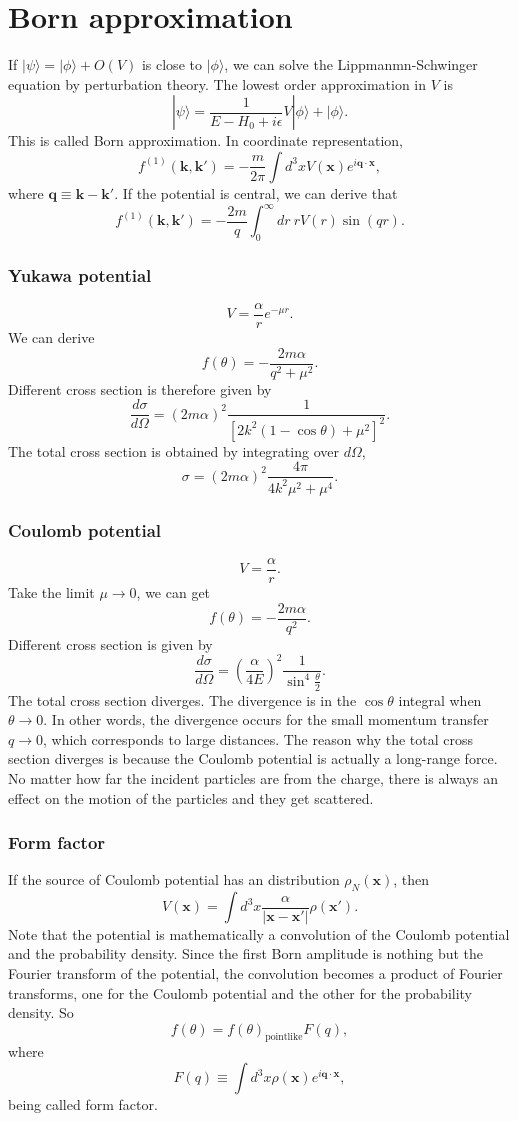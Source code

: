 \section{Born approximation}
If $|\psi\rangle = |\phi\rangle + O(V)$ is close to $|\phi\rangle$, we can solve the Lippmanmn-Schwinger equation by perturbation theory. The lowest order approximation in $V$ is
\[|\psi\rangle = \frac{1}{E-H_0 + i\epsilon} V|\phi\rangle + |\phi\rangle.\]
This is called Born approximation. In coordinate representation,
\[f^{(1)}(\bm{k},\bm{k}') = - \frac{m}{2\pi} \int d^3x V(\bm{x}) e^{i\bm{q}\cdot\bm{x}},\]
where $\bm{q} \equiv \bm{k} - \bm{k}'$. If the potential is central, we can derive that
\[f^{(1)}(\bm{k},\bm{k}') = - \frac{2m}{q} \int_0^{\infty} dr \: r V(r) \sin(qr).\]

\subsubsection{Yukawa potential}
\[V = \frac{\alpha}{r}  e^{-\mu r}.\]
We can derive
\[f(\theta) = - \frac{2m\alpha}{q^2 + \mu^2}.\]
Different cross section is therefore given by
\[\frac{d\sigma}{d\Omega} = (2m\alpha)^2 \frac{1}{[2k^2(1-\cos\theta) + \mu^2]^2}.\]
The total cross section is obtained by integrating over $d\Omega$,
\[\sigma = (2m\alpha)^2 \frac{4\pi}{4k^2\mu^2 + \mu^4}.\]

\subsubsection{Coulomb potential}
\[V = \frac{\alpha}{r}.\]
Take the limit $\mu \to 0$, we can get
\[f(\theta) = - \frac{2m\alpha}{q^2}.\]
Different cross section is given by
\[\frac{d\sigma}{d\Omega} = (\frac{\alpha}{4E})^2 \frac{1}{\sin^4{\frac{\theta}{2}}}.\]
The total cross section diverges. The divergence is in the $\cos\theta$ integral when $\theta \to 0$. In other words, the divergence occurs for the small momentum transfer $q \to 0$, which corresponds to large distances.
The reason why the total cross section diverges is because the Coulomb potential is actually a long-range force. No matter how far the incident particles are from the charge, there is always an effect on the motion of the particles and they get scattered.

\subsubsection{Form factor}
\noindent
If the source of Coulomb potential has an distribution $\rho_N(\bm{x})$, then
\[V(\bm{x}) = \int d^3x \frac{\alpha}{|\bm{x}-\bm{x}'|} \rho(\bm{x}').\]
Note that the potential is mathematically a convolution of the Coulomb potential and the probability density. Since the first Born amplitude is nothing but the Fourier transform of the potential, the convolution becomes a product of Fourier transforms, one for the Coulomb potential and the other for the probability density. So
\[f(\theta) = f(\theta)_{\mathrm{pointlike}} F(q),\]
where
\[F(q) \equiv \int d^3x \rho(\bm{x}) e^{i \bm{q} \cdot \bm{x}},\]
being called form factor.

